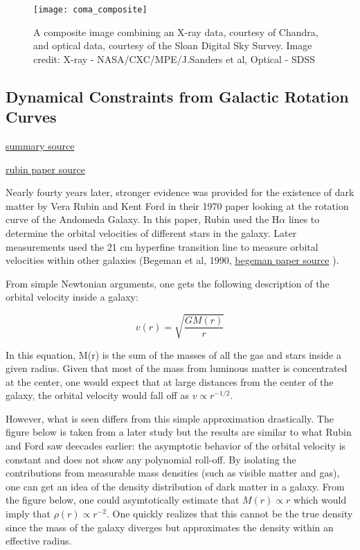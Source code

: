 \documentclass[12pt,twoside]{report}
\begin{document}
\begin{figure}[h]
\texttt{[image: coma\_composite]}
\centering
\caption{A composite image combining an X-ray data, courtesy of Chandra, and optical data, courtesy of the Sloan Digital Sky Survey.  Image credit: X-ray - NASA/CXC/MPE/J.Sanders et al, Optical - SDSS}
\end{figure}
	
	
\subsection{Dynamical Constraints from Galactic Rotation Curves}	
	
\href{http://www.skyandtelescope.com/astronomy-resources/vera-rubin-dark-matter-detective/}{summary source}	

\href{http://articles.adsabs.harvard.edu/full/1970ApJ...159..379R}{rubin paper source}	
	
Nearly fourty years later, stronger evidence was provided for the existence of dark matter by Vera Rubin and Kent Ford in their 1970 paper looking at the rotation curve of the Andomeda Galaxy.  In this paper, Rubin used the H$\alpha$ lines to determine the orbital velocities of different stars in the galaxy.  Later measurements used the 21 cm hyperfine transition line to measure orbital velocities within other galaxies (Begeman et al, 1990, \href{http://adsabs.harvard.edu/full/1991MNRAS.249..523B}{begeman paper source}	).
	
	From simple Newtonian arguments, one gets the following description of the orbital velocity inside a galaxy:
	
\begin{equation}
v(r) = \sqrt{\frac{G M(r)}{r}}
\end{equation}	

In this equation, M(r) is the sum of the masses of all the gas and stars inside a given radius.  Given that most of the mass from luminous matter is concentrated at the center, one would expect that at large distances from the center of the galaxy, the orbital velocity would fall off as $v \propto r^{-1/2}$.

However, what is seen differs from this simple approximation drastically.  The figure below is taken from a later study but the results are similar to what Rubin and Ford saw deecades earlier: the asymptotic behavior of the orbital velocity is constant and does not show any polynomial roll-off.  By isolating the contributions from measurable mass densities (such as visible matter and gas), one can get an idea of the density distribution of dark matter in a galaxy.  From the figure below, one could asymtotically estimate that $M(r) \propto r$ which would imply that $\rho(r) \propto r^{-2}$.  One quickly realizes that this cannot be the true density since the mass of the galaxy diverges but approximates the density within an effective radius.
\end{document}
